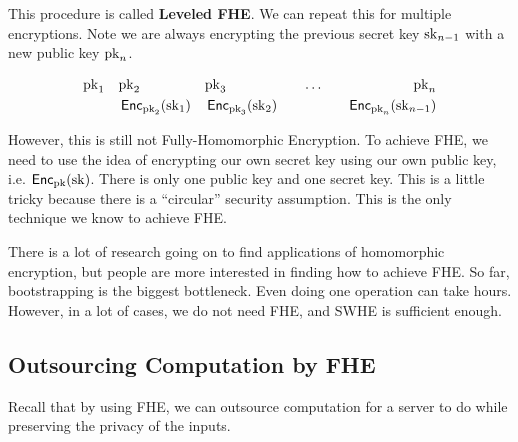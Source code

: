 \begin{center}
    \def\svgwidth{0.7\columnwidth}
    
\end{center}

This procedure is called \textbf{Leveled FHE}. We can repeat this for multiple encryptions. Note we are always encrypting the previous secret key $\mathrm{sk}_{n-1}$ with a new public key $\mathrm{pk}_n$.

\begin{align*}
    \mathrm{pk}_1 \quad & \mathrm{pk}_2  && \mathrm{pk}_3 &&& \dots &&&& \mathrm{pk}_n\\
    & \operatorname{\mathsf{Enc}}_{\mathrm{pk}_2}(\mathrm{sk}_1) && \operatorname{\mathsf{Enc}}_{\mathrm{pk}_3}(\mathrm{sk}_2) &&& &&&& \operatorname{\mathsf{Enc}}_{\mathrm{pk}_n}(\mathrm{sk}_{n-1})
\end{align*}

However, this is still not Fully-Homomorphic Encryption. To achieve FHE, we need to use the idea of encrypting our own secret key using our own public key, i.e. $\operatorname{\mathsf{Enc}}_{\mathrm{pk}}(\mathrm{sk})$. There is only one public key and one secret key. This is a little tricky because there is a ``circular'' security assumption. This is the only technique we know to achieve FHE.

There is a lot of research going on to find applications of homomorphic encryption, but people are more interested in finding how to achieve FHE. So far, bootstrapping is the biggest bottleneck. Even doing one operation can take hours. However, in a lot of cases, we do not need FHE, and SWHE is sufficient enough.

\subsection{Outsourcing Computation by FHE}

Recall that by using FHE, we can outsource computation for a server to do while preserving the privacy of the inputs.


